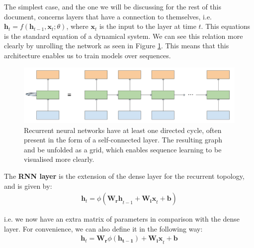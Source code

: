 \documentclass[pdftex,11pt,a4paper]{article}
\theoremstyle{definition}
\theoremstyle{remark}
\newcommand*{\V}[1]{\mathbf{#1}}%
\begin{document}
\par The simplest case, and the one we will be discussing for the rest of this document, concerns layers that have a connection to themselves, i.e. $\V{h}_t = f(\V{h}_{t-1}, \V{x}_t ; \theta)$, where $\V{x}_t$ is the input to the layer at time $t$. This equations is the standard equation of a dynamical system. We can see this relation more clearly by unrolling the network as seen in Figure \ref{fig:rnn}. This means that this architecture enables us to train models over sequences.

\begin{figure}[t]
    \centering
    \includegraphics[width=\textwidth]{figs/rnn.png}
    \caption{Recurrent neural networks have at least one directed cycle, often present in the form of a self-connected layer. The resulting graph and be unfolded as a grid, which enables sequence learning to be visualised more clearly.}
    \label{fig:rnn}
\end{figure}

\par The \textbf{RNN layer} is the extension of the dense layer for the recurrent topology, and is given by:
\begin{align*}
    \V{h}_t = \phi(\V{W_rh}_{t-1} + \V{W_ix}_t + \V{b})
\end{align*}

\par i.e. we now have an extra matrix of parameters in comparison with the dense layer. For convenience, we can also define it in the following way:
\begin{align*}
    \V{h}_t = \V{W_r}\phi(\V{h_{t-1}}) + \V{W_ix}_t + \V{b}
\end{align*}
\end{document}
